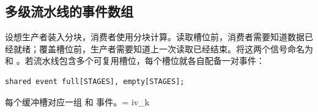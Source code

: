 \subsection*{多级流水线的事件数组}

设想生产者装入分块，消费者使用分块计算。读取槽位前，消费者需要知道数据已经就绪；覆盖槽位前，生产者需要知道上一次读取已经结束。将这两个信号命名为 \co@full@ 和 \co@empty@。若流水线包含多个可复用槽位，每个槽位就各自配备一对事件：

\begin{lstlisting}[language=croqtile,caption={多级流水线的事件数组}]
shared event full[STAGES], empty[STAGES];
\end{lstlisting}

每个缓冲槽对应一组 \co@full@ 和 \co@empty@ 事件。\co@stage = iv_k %
